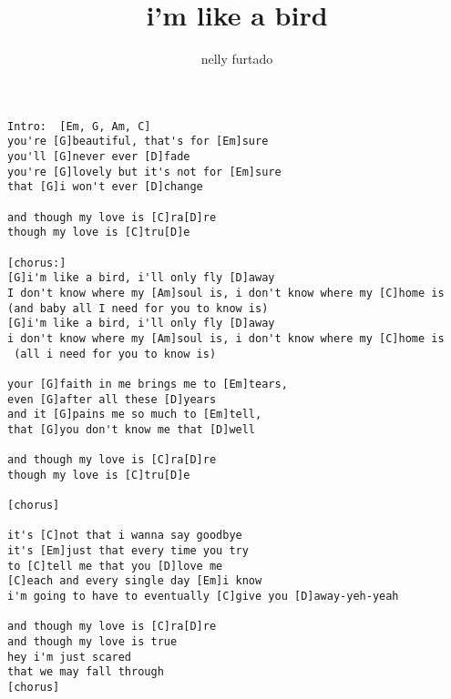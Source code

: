 \author{nelly furtado}
\title{i'm like a bird}
\maketitle
\begin{verbatim}
Intro:  [Em, G, Am, C]
you're [G]beautiful, that's for [Em]sure
you'll [G]never ever [D]fade
you're [G]lovely but it's not for [Em]sure
that [G]i won't ever [D]change

and though my love is [C]ra[D]re
though my love is [C]tru[D]e

[chorus:]
[G]i'm like a bird, i'll only fly [D]away
I don't know where my [Am]soul is, i don't know where my [C]home is
(and baby all I need for you to know is)
[G]i'm like a bird, i'll only fly [D]away
i don't know where my [Am]soul is, i don't know where my [C]home is
 (all i need for you to know is)

your [G]faith in me brings me to [Em]tears,
even [G]after all these [D]years
and it [G]pains me so much to [Em]tell,
that [G]you don't know me that [D]well

and though my love is [C]ra[D]re
though my love is [C]tru[D]e

[chorus]

it's [C]not that i wanna say goodbye
it's [Em]just that every time you try 
to [C]tell me that you [D]love me
[C]each and every single day [Em]i know
i'm going to have to eventually [C]give you [D]away-yeh-yeah

and though my love is [C]ra[D]re
and though my love is true
hey i'm just scared
that we may fall through
[chorus]
\end{verbatim}